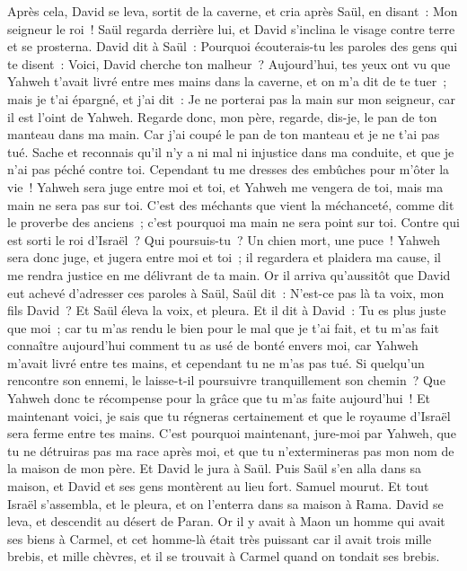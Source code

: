 \begin{multicols}{2}
Après cela, David se leva, sortit de la caverne, et cria après Saül, en disant~: Mon seigneur le roi~! Saül regarda derrière lui, et David s'inclina le visage contre terre et se prosterna.
David dit à Saül~: Pourquoi écouterais-tu les paroles des gens qui te disent~: Voici, David cherche ton malheur~?
Aujourd'hui, tes yeux ont vu que Yahweh t'avait livré entre mes mains dans la caverne, et on m'a dit de te tuer~; mais je t'ai épargné, et j'ai dit~: Je ne porterai pas la main sur mon seigneur, car il est l'oint de Yahweh.
Regarde donc, mon père, regarde, dis-je, le pan de ton manteau dans ma main. Car j'ai coupé le pan de ton manteau et je ne t'ai pas tué. Sache et reconnais qu'il n'y a ni mal ni injustice dans ma conduite, et que je n'ai pas péché contre toi. Cependant tu me dresses des embûches pour m'ôter la vie~!
Yahweh sera juge entre moi et toi, et Yahweh me vengera de toi, mais ma main ne sera pas sur toi.
C'est des méchants que vient la méchanceté, comme dit le proverbe des anciens~; c'est pourquoi ma main ne sera point sur toi.
Contre qui est sorti le roi d'Israël~? Qui poursuis-tu~? Un chien mort, une puce~!
Yahweh sera donc juge, et jugera entre moi et toi~; il regardera et plaidera ma cause, il me rendra justice en me délivrant de ta main.
Or il arriva qu'aussitôt que David eut achevé d'adresser ces paroles à Saül, Saül dit~: N'est-ce pas là ta voix, mon fils David~? Et Saül éleva la voix, et pleura.
Et il dit à David~: Tu es plus juste que moi~; car tu m'as rendu le bien pour le mal que je t'ai fait,
et tu m'as fait connaître aujourd'hui comment tu as usé de bonté envers moi, car Yahweh m'avait livré entre tes mains, et cependant tu ne m'as pas tué.
Si quelqu'un rencontre son ennemi, le laisse-t-il poursuivre tranquillement son chemin~? Que Yahweh donc te récompense pour la grâce que tu m'as faite aujourd'hui~!
Et maintenant voici, je sais que tu régneras certainement et que le royaume d'Israël sera ferme entre tes mains.
C'est pourquoi maintenant, jure-moi par Yahweh, que tu ne détruiras pas ma race après moi, et que tu n'extermineras pas mon nom de la maison de mon père.
Et David le jura à Saül. Puis Saül s'en alla dans sa maison, et David et ses gens montèrent au lieu fort.
\VerseOne{}Samuel mourut. Et tout Israël s'assembla, et le pleura, et on l'enterra dans sa maison à Rama. David se leva, et descendit au désert de Paran.
Or il y avait à Maon un homme qui avait ses biens à Carmel, et cet homme-là était très puissant car il avait trois mille brebis, et mille chèvres, et il se trouvait à Carmel quand on tondait ses brebis.

\end{multicols}
